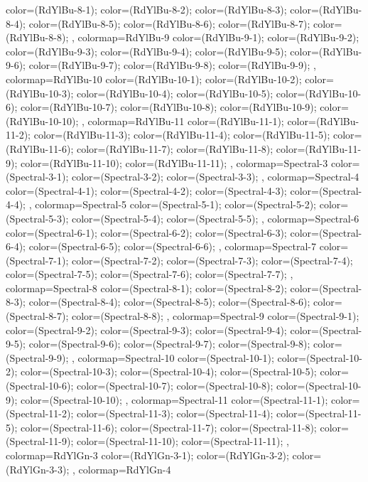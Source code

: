 {{color=(RdYlBu-8-1);
color=(RdYlBu-8-2);
color=(RdYlBu-8-3);
color=(RdYlBu-8-4);
color=(RdYlBu-8-5);
color=(RdYlBu-8-6);
color=(RdYlBu-8-7);
color=(RdYlBu-8-8);
},
colormap={RdYlBu-9}{
color=(RdYlBu-9-1);
color=(RdYlBu-9-2);
color=(RdYlBu-9-3);
color=(RdYlBu-9-4);
color=(RdYlBu-9-5);
color=(RdYlBu-9-6);
color=(RdYlBu-9-7);
color=(RdYlBu-9-8);
color=(RdYlBu-9-9);
},
colormap={RdYlBu-10}{
color=(RdYlBu-10-1);
color=(RdYlBu-10-2);
color=(RdYlBu-10-3);
color=(RdYlBu-10-4);
color=(RdYlBu-10-5);
color=(RdYlBu-10-6);
color=(RdYlBu-10-7);
color=(RdYlBu-10-8);
color=(RdYlBu-10-9);
color=(RdYlBu-10-10);
},
colormap={RdYlBu-11}{
color=(RdYlBu-11-1);
color=(RdYlBu-11-2);
color=(RdYlBu-11-3);
color=(RdYlBu-11-4);
color=(RdYlBu-11-5);
color=(RdYlBu-11-6);
color=(RdYlBu-11-7);
color=(RdYlBu-11-8);
color=(RdYlBu-11-9);
color=(RdYlBu-11-10);
color=(RdYlBu-11-11);
},
colormap={Spectral-3}{
color=(Spectral-3-1);
color=(Spectral-3-2);
color=(Spectral-3-3);
},
colormap={Spectral-4}{
color=(Spectral-4-1);
color=(Spectral-4-2);
color=(Spectral-4-3);
color=(Spectral-4-4);
},
colormap={Spectral-5}{
color=(Spectral-5-1);
color=(Spectral-5-2);
color=(Spectral-5-3);
color=(Spectral-5-4);
color=(Spectral-5-5);
},
colormap={Spectral-6}{
color=(Spectral-6-1);
color=(Spectral-6-2);
color=(Spectral-6-3);
color=(Spectral-6-4);
color=(Spectral-6-5);
color=(Spectral-6-6);
},
colormap={Spectral-7}{
color=(Spectral-7-1);
color=(Spectral-7-2);
color=(Spectral-7-3);
color=(Spectral-7-4);
color=(Spectral-7-5);
color=(Spectral-7-6);
color=(Spectral-7-7);
},
colormap={Spectral-8}{
color=(Spectral-8-1);
color=(Spectral-8-2);
color=(Spectral-8-3);
color=(Spectral-8-4);
color=(Spectral-8-5);
color=(Spectral-8-6);
color=(Spectral-8-7);
color=(Spectral-8-8);
},
colormap={Spectral-9}{
color=(Spectral-9-1);
color=(Spectral-9-2);
color=(Spectral-9-3);
color=(Spectral-9-4);
color=(Spectral-9-5);
color=(Spectral-9-6);
color=(Spectral-9-7);
color=(Spectral-9-8);
color=(Spectral-9-9);
},
colormap={Spectral-10}{
color=(Spectral-10-1);
color=(Spectral-10-2);
color=(Spectral-10-3);
color=(Spectral-10-4);
color=(Spectral-10-5);
color=(Spectral-10-6);
color=(Spectral-10-7);
color=(Spectral-10-8);
color=(Spectral-10-9);
color=(Spectral-10-10);
},
colormap={Spectral-11}{
color=(Spectral-11-1);
color=(Spectral-11-2);
color=(Spectral-11-3);
color=(Spectral-11-4);
color=(Spectral-11-5);
color=(Spectral-11-6);
color=(Spectral-11-7);
color=(Spectral-11-8);
color=(Spectral-11-9);
color=(Spectral-11-10);
color=(Spectral-11-11);
},
colormap={RdYlGn-3}{
color=(RdYlGn-3-1);
color=(RdYlGn-3-2);
color=(RdYlGn-3-3);
},
colormap={RdYlGn-4}{
}}
